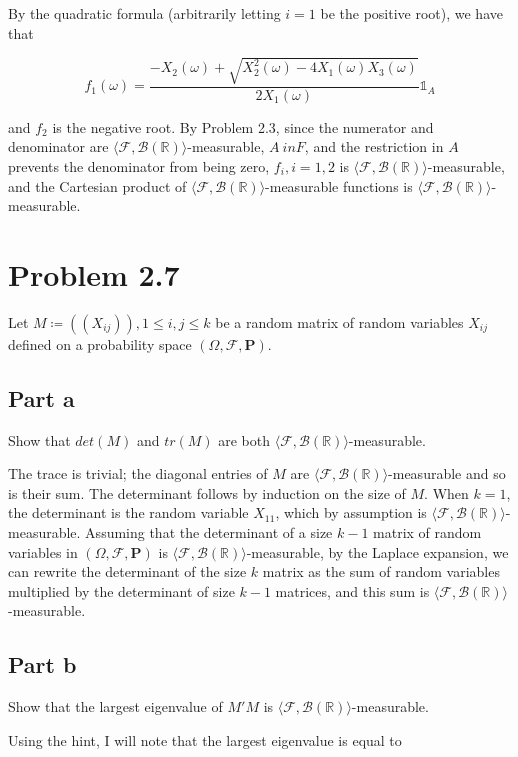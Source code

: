 \documentclass{article}
\newcommand{\R}{\mathbb{R}}
\newcommand{\F}{\mathcal{F}}
\newcommand{\B}{\mathcal{B}}
\newcommand{\prob}{\boldsymbol{P}}
\begin{document}
By the quadratic formula (arbitrarily letting $i=1$ be the positive root), we have that

\[
f_1(\omega) = \frac{-X_2(\omega) + \sqrt{X_2^2(\omega) - 4X_1(\omega)X_3(\omega)}}{2X_1(\omega)} \mathds{1}_A
\]

and $f_2$ is the negative root. By Problem 2.3, since the numerator and denominator are $\langle \F, \B(\R) \rangle$-measurable, $A \ in F$, and the restriction in $A$ prevents the denominator from being zero, $f_i, i = 1, 2$ is $\langle \F, \B(\R) \rangle$-measurable, and the Cartesian product of $\langle \F, \B(\R) \rangle$-measurable functions is $\langle \F, \B(\R) \rangle$-measurable.

\section*{Problem 2.7}

Let $M \coloneq ((X_{ij})), 1 \leq i,j \leq k$ be a random matrix of random variables $X_{ij}$ defined on a probability space $(\Omega, \F, \prob)$.

\subsection*{Part a}

Show that $det(M)$ and $tr(M)$ are both $\langle \F, \B(\R) \rangle$-measurable.

The trace is trivial; the diagonal entries of $M$ are $\langle \F, \B(\R) \rangle$-measurable and so is their sum. The determinant follows by induction on the size of $M$. When $k=1$, the determinant is the random variable $X_{11}$, which by assumption is $\langle \F, \B(\R) \rangle$-measurable. Assuming that the determinant of a size $k-1$ matrix of random variables in $(\Omega, \F, \prob)$ is $\langle \F, \B(\R) \rangle$-measurable, by the Laplace expansion, we can rewrite the determinant of the size $k$ matrix as the sum of random variables multiplied by the determinant of size $k-1$ matrices, and this sum is $\langle \F, \B(\R) \rangle$-measurable.

\subsection*{Part b}

Show that the largest eigenvalue of $M'M$ is $\langle \F, \B(\R) \rangle$-measurable.

Using the hint, I will note that the largest eigenvalue is equal to
\end{document}
